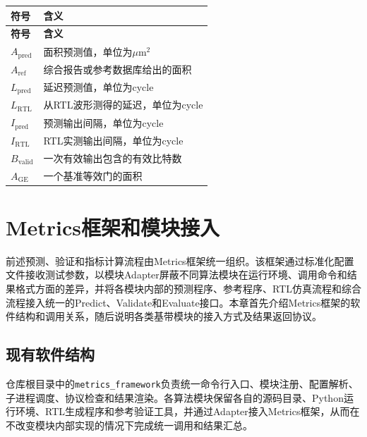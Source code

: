 \documentclass[a4paper,oneside,11pt]{ctexrep}
\newcommand{\metricheader}[1]{\textbf{#1}}
\begin{document}
\begin{longtable}{lp{}}
    \toprule
    \metricheader{符号} & \metricheader{含义} \\
    \midrule
    \endfirsthead
    \toprule
    \metricheader{符号} & \metricheader{含义} \\
    \midrule
    \endhead
    $A_{\mathrm{pred}}$ & 面积预测值，单位为$\mu\mathrm{m}^{2}$ \\
    $A_{\mathrm{ref}}$ & 综合报告或参考数据库给出的面积 \\
    $L_{\mathrm{pred}}$ & 延迟预测值，单位为cycle \\
    $L_{\mathrm{RTL}}$ & 从RTL波形测得的延迟，单位为cycle \\
    $I_{\mathrm{pred}}$ & 预测输出间隔，单位为cycle \\
    $I_{\mathrm{RTL}}$ & RTL实测输出间隔，单位为cycle \\
    $B_{\mathrm{valid}}$ & 一次有效输出包含的有效比特数 \\
    $A_{\mathrm{GE}}$ & 一个基准等效门的面积 \\
    \bottomrule
\end{longtable}

\chapter{Metrics框架和模块接入}

前述预测、验证和指标计算流程由Metrics框架统一组织。该框架通过标准化配置文件接收测试参数，以模块Adapter屏蔽不同算法模块在运行环境、调用命令和结果格式方面的差异，并将各模块内部的预测程序、参考程序、RTL仿真流程和综合流程接入统一的Predict、Validate和Evaluate接口。本章首先介绍Metrics框架的软件结构和调用关系，随后说明各类基带模块的接入方式及结果返回协议。
\section{现有软件结构}

仓库根目录中的\texttt{metrics\_framework}负责统一命令行入口、模块注册、配置解析、子进程调度、协议检查和结果渲染。各算法模块保留各自的源码目录、Python运行环境、RTL生成程序和参考验证工具，并通过Adapter接入Metrics框架，从而在不改变模块内部实现的情况下完成统一调用和结果汇总。
\end{document}
